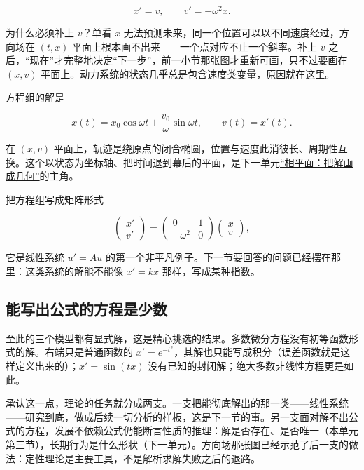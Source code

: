 \[
x'=v,
\qquad
v'=-\omega^2x.
\]

为什么必须补上 \(v\)？单看 \(x\) 无法预测未来，同一个位置可以以不同速度经过，方向场在 \((t,x)\) 平面上根本画不出来——一个点对应不止一个斜率。补上 \(v\) 之后，``现在''才完整地决定``下一步''，前一小节那张图才重新可画，只不过要画在 \((x,v)\) 平面上。动力系统的状态几乎总是包含速度类变量，原因就在这里。

方程组的解是

\[
x(t)=x_0\cos\omega t+\frac{v_0}{\omega}\sin\omega t,
\qquad
v(t)=x'(t).
\]

在 \((x,v)\) 平面上，轨迹是绕原点的闭合椭圆，位置与速度此消彼长、周期性互换。这个以状态为坐标轴、把时间退到幕后的平面，是下一单元\hyperref[sec:15-Differential-Equations-and-Dynamical-Systems/02-Stability-and-Dynamical-Systems/01]{``相平面：把解画成几何''}的主角。

把方程组写成矩阵形式

\[
\begin{pmatrix}x'\\v'\end{pmatrix}
=
\begin{pmatrix}0&1\\-\omega^2&0\end{pmatrix}
\begin{pmatrix}x\\v\end{pmatrix},
\]

它是线性系统 \(u'=Au\) 的第一个非平凡例子。下一节要回答的问题已经摆在那里：这类系统的解能不能像 \(x'=kx\) 那样，写成某种指数。

\subsection{能写出公式的方程是少数}

至此的三个模型都有显式解，这是精心挑选的结果。多数微分方程没有初等函数形式的解。右端只是普通函数的 \(x'=e^{-t^2}\)，其解也只能写成积分（误差函数就是这样定义出来的）；\(x'=\sin(tx)\) 没有已知的封闭解；绝大多数非线性方程更是如此。

承认这一点，理论的任务就分成两支。一支把能彻底解出的那一类——线性系统——研究到底，做成后续一切分析的样板，这是下一节的事。另一支面对解不出公式的方程，发展不依赖公式仍能断言性质的推理：解是否存在、是否唯一（本单元第三节），长期行为是什么形状（下一单元）。方向场那张图已经示范了后一支的做法：定性理论是主要工具，不是解析求解失败之后的退路。
